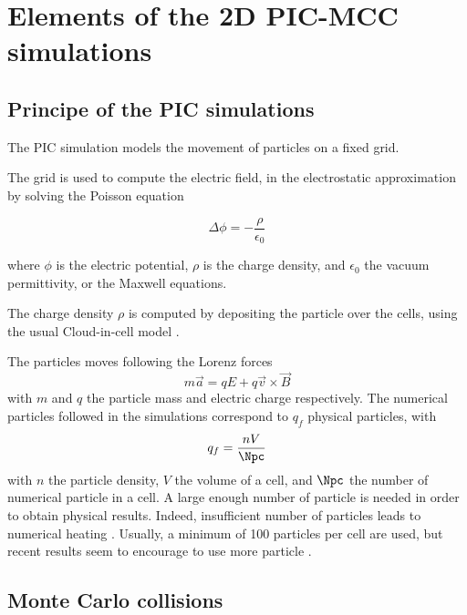 
\section{Elements of the 2D PIC-MCC simulations}

  \subsection{Principe of the PIC simulations}

    The \ac{PIC} simulation models the movement of particles on a fixed grid.

    The grid is used to compute the electric field, in the electrostatic approximation by solving the Poisson equation

    \begin{equation}
      \label{eq-poisson}
      \Delta \phi = - \frac{\rho}{\epsilon_0}
    \end{equation}

    where $\phi$ is the electric potential, $\rho$ is the charge density, and $\epsilon_0$ the vacuum permittivity, or the Maxwell equations.

    The charge density $\rho$ is computed by depositing the particle over the cells, using the usual Cloud-in-cell model \cite{birdsall1991}.

    The particles moves following the Lorenz forces
    \begin{equation}
      \label{eq-Lor}
      m \vec{a} = q E + q \vec{v} \times \vec{B}
    \end{equation}
    with $m$ and $q$ the particle mass and electric charge respectively.
    The numerical particles followed in the simulations correspond to $q_f$ physical particles, with
    \begin{equation}
      q_f = \frac{n V}{\Npc}
    \end{equation}
    with $n$ the particle density, $V$ the volume of a cell, and $\Npc$ the number of numerical particle in a cell.
    A large enough number of particle is needed in order to obtain physical results.
    Indeed, insufficient number of particles leads to numerical heating \cite{ueda1994}.
    Usually, a minimum of 100 particles per cell are used, but recent results seem to encourage to use more particle \cite{janhunen2018}.

  \subsection{Monte Carlo collisions}

